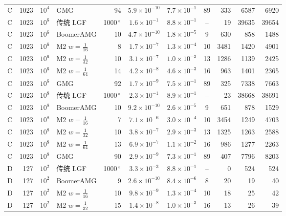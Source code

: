 \begin{longtable}{lrrlrcccrrr}
C & 1023 & $10^{4}$ & GMG & 94 & $5.9{\times}10^{-10}$ & $7.7{\times}10^{-1}$ & 89 & 333 & 6587 & 6920 \\
C & 1023 & $10^{6}$ & 传统 LGF & 1000$^\times$ & $1.6{\times}10^{-1}$ & $8.8{\times}10^{-1}$ & -- & 19 & 39635 & 39654 \\
C & 1023 & $10^{6}$ & BoomerAMG & 10 & $4.7{\times}10^{-10}$ & $1.8{\times}10^{-5}$ & 9 & 630 & 858 & 1488 \\
C & 1023 & $10^{6}$ & M2 $w{=}\frac1{16}$ & 8 & $1.7{\times}10^{-7}$ & $1.3{\times}10^{-4}$ & 10 & 3481 & 1420 & 4901 \\
C & 1023 & $10^{6}$ & M2 $w{=}\frac1{32}$ & 10 & $3.1{\times}10^{-7}$ & $1.0{\times}10^{-3}$ & 13 & 1286 & 1139 & 2425 \\
C & 1023 & $10^{6}$ & M2 $w{=}\frac1{64}$ & 14 & $4.2{\times}10^{-8}$ & $4.6{\times}10^{-3}$ & 16 & 963 & 1401 & 2365 \\
C & 1023 & $10^{6}$ & GMG & 92 & $1.7{\times}10^{-9}$ & $7.5{\times}10^{-1}$ & 89 & 325 & 7338 & 7663 \\
C & 1023 & $10^{8}$ & 传统 LGF & 1000$^\times$ & $2.3{\times}10^{-1}$ & $8.9{\times}10^{-1}$ & -- & 23 & 38668 & 38691 \\
C & 1023 & $10^{8}$ & BoomerAMG & 10 & $9.2{\times}10^{-10}$ & $2.6{\times}10^{-5}$ & 9 & 651 & 878 & 1529 \\
C & 1023 & $10^{8}$ & M2 $w{=}\frac1{16}$ & 7 & $7.1{\times}10^{-6}$ & $3.0{\times}10^{-4}$ & 10 & 3454 & 1249 & 4703 \\
C & 1023 & $10^{8}$ & M2 $w{=}\frac1{32}$ & 10 & $3.8{\times}10^{-7}$ & $2.9{\times}10^{-3}$ & 13 & 1325 & 1263 & 2588 \\
C & 1023 & $10^{8}$ & M2 $w{=}\frac1{64}$ & 13 & $6.9{\times}10^{-7}$ & $1.1{\times}10^{-2}$ & 16 & 986 & 1277 & 2263 \\
C & 1023 & $10^{8}$ & GMG & 90 & $2.9{\times}10^{-9}$ & $7.3{\times}10^{-1}$ & 89 & 407 & 7796 & 8203 \\
D & 127 & $10^{2}$ & 传统 LGF & 1000$^\times$ & $3.3{\times}10^{-3}$ & $8.8{\times}10^{-1}$ & -- & 0 & 524 & 524 \\
D & 127 & $10^{2}$ & BoomerAMG & 9 & $2.6{\times}10^{-10}$ & $8.4{\times}10^{-6}$ & 8 & 20 & 19 & 40 \\
D & 127 & $10^{2}$ & M2 $w{=}\frac1{16}$ & 10 & $9.8{\times}10^{-9}$ & $1.3{\times}10^{-4}$ & 10 & 18 & 25 & 42 \\
D & 127 & $10^{2}$ & M2 $w{=}\frac1{32}$ & 15 & $1.4{\times}10^{-8}$ & $1.0{\times}10^{-3}$ & 16 & 13 & 26 & 39 \\

\end{longtable}
